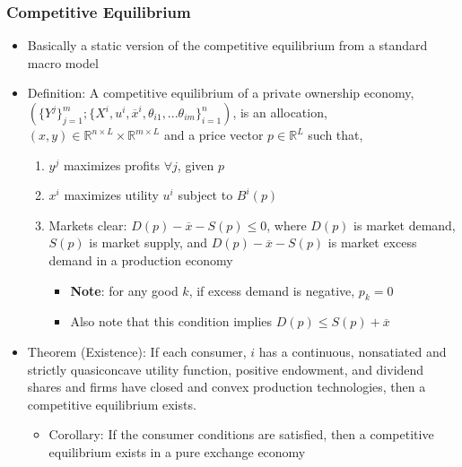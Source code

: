 \documentclass{article}
\newcommand{\R}{\mathbb{R}}
\newcommand{\olx}{\overline{x}}
\newcommand{\blue}[1]{{\color{blue}#1}}
\begin{document}
\subsubsection{Competitive Equilibrium}
\begin{itemize}
	\item Basically a static version of the competitive equilibrium from a standard macro model
	\item \blue{Definition:} A \blue{competitive equilibrium} of a private ownership economy, ${\left(\{Y^j\}_{j=1}^m;\{X^i,u^i,\olx^i,\theta_{i1},...\theta_{im}\}_{i=1}^n\right)}$, is an allocation, ${(x,y)\in\R^{n\times L}\times\R^{m\times L}}$ and a price vector $p\in\R^L$ such that,
		\begin{enumerate}
			\item $y^j$ maximizes profits $\forall j$, given $p$
			\item $x^i$ maximizes utility $u^i$ subject to $B^i(p)$
			\item Markets clear: ${D(p)-\olx-S(p)\leq 0}$, where $D(p)$ is market demand, $S(p)$ is market supply, and ${D(p)-\olx-S(p)}$ is market excess demand in a production economy
				\begin{itemize}
					\item \textbf{Note}: for any good $k$, if excess demand is negative, $p_k=0$
					\item Also note that this condition implies ${D(p)\leq S(p) + \olx}$
				\end{itemize}
		\end{enumerate}
	\item \blue{Theorem (Existence):} If each consumer, $i$ has a continuous, nonsatiated and strictly quasiconcave utility function, positive endowment, and dividend shares and firms have closed and convex production technologies, then a competitive equilibrium exists.
		\begin{itemize}
			\item Corollary: If the consumer conditions are satisfied, then a competitive equilibrium exists in a pure exchange economy
		\end{itemize}
\end{itemize}
\end{document}
